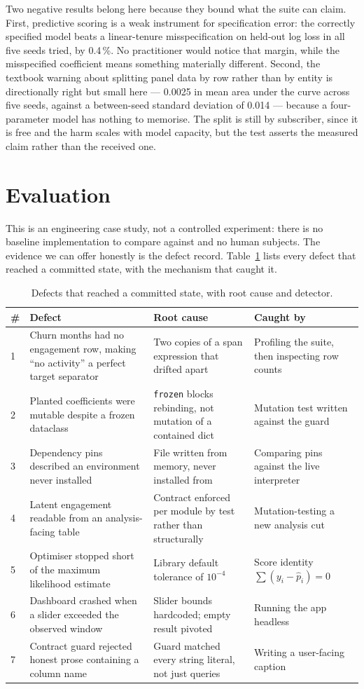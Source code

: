 \documentclass[conference]{IEEEtran}
\begin{document}
Two negative results belong here because they bound what the suite can claim.
First, predictive scoring is a weak instrument for specification error: the
correctly specified model beats a linear-tenure misspecification on held-out
log loss in all five seeds tried, by 0.4\,\%. No practitioner would notice that
margin, while the misspecified coefficient means something materially different.
Second, the textbook warning about splitting panel data by row rather than by
entity is directionally right but small here --- 0.0025 in mean area under the
curve across five seeds, against a between-seed standard deviation of 0.014 ---
because a four-parameter model has nothing to memorise. The split is still by
subscriber, since it is free and the harm scales with model capacity, but the
test asserts the measured claim rather than the received one.

\section{Evaluation}

This is an engineering case study, not a controlled experiment: there is no
baseline implementation to compare against and no human subjects. The evidence
we can offer honestly is the defect record. Table~\ref{tab:defects} lists every
defect that reached a committed state, with the mechanism that caught it.

\begin{table}[t]
\caption{Defects that reached a committed state, with root cause and detector.}
\label{tab:defects}
\centering
\begin{tabular}{@{}llll@{}}
\toprule
\# & Defect & Root cause & Caught by \\
\midrule
1 & Churn months had no engagement row, making ``no activity'' a perfect
target separator & Two copies of a span expression that drifted apart & Profiling
the suite, then inspecting row counts \\
2 & Planted coefficients were mutable despite a frozen dataclass & \texttt{frozen}
blocks rebinding, not mutation of a contained dict & Mutation test written
against the guard \\
3 & Dependency pins described an environment never installed & File written from
memory, never installed from & Comparing pins against the live interpreter \\
4 & Latent engagement readable from an analysis-facing table & Contract enforced
per module by test rather than structurally & Mutation-testing a new analysis
cut \\
5 & Optimiser stopped short of the maximum likelihood estimate & Library default
tolerance of $10^{-4}$ & Score identity $\sum(y_i - \hat p_i) = 0$ \\
6 & Dashboard crashed when a slider exceeded the observed window & Slider bounds
hardcoded; empty result pivoted & Running the app headless \\
7 & Contract guard rejected honest prose containing a column name & Guard matched
every string literal, not just queries & Writing a user-facing caption \\
\bottomrule
\end{tabular}
\end{table}
\end{document}
